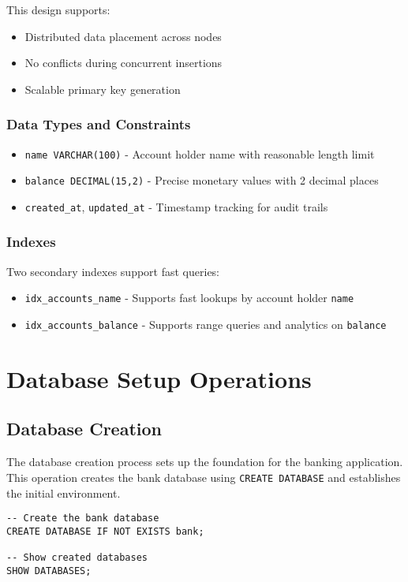 This design supports:
\begin{itemize}
    \item Distributed data placement across nodes
    \item No conflicts during concurrent insertions
    \item Scalable primary key generation
\end{itemize}

\subsubsection{Data Types and Constraints}
\begin{itemize}
    \item \texttt{name VARCHAR(100)} - Account holder name with reasonable length limit
    \item \texttt{balance DECIMAL(15,2)} - Precise monetary values with 2 decimal places
    \item \texttt{created\_at}, \texttt{updated\_at} - Timestamp tracking for audit trails
\end{itemize}

\subsubsection{Indexes}
Two secondary indexes support fast queries:
\begin{itemize}
    \item \texttt{idx\_accounts\_name} - Supports fast lookups by account holder \texttt{name}
    \item \texttt{idx\_accounts\_balance} - Supports range queries and analytics on \texttt{balance}
\end{itemize}

\section{Database Setup Operations}

\subsection{Database Creation}
The database creation process sets up the foundation for the banking application. This operation creates the bank database using \texttt{CREATE DATABASE} and establishes the initial environment.

\begin{verbatim}
-- Create the bank database
CREATE DATABASE IF NOT EXISTS bank;

-- Show created databases
SHOW DATABASES;
\end{verbatim}

